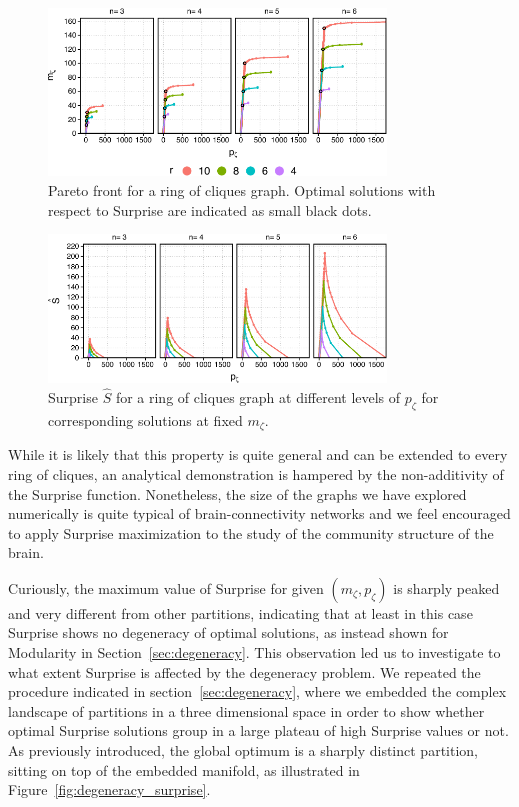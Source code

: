 \begin{figure}[htb!]
\centering
\includegraphics[width=0.8\textwidth]{images/ring_cliques_pareto.pdf}
\caption{Pareto front for a ring of cliques graph. Optimal solutions with respect to Surprise are indicated as small black dots.}
\label{fig:ring_cliques_pareto}
\end{figure}

\begin{figure}[htb!]
\centering
\includegraphics[width=0.8\textwidth]{images/ring_cliques_surprise.pdf}
\caption{Surprise $\hat{S}$ for a ring of cliques graph at different levels of $p_\zeta$ for corresponding solutions at fixed $m_\zeta$.}
\label{fig:ring_cliques_surprise}
\end{figure}

While it is likely that this property is quite general and can be extended to every ring of cliques, an analytical demonstration is hampered by the non-additivity of the Surprise function.
Nonetheless, the size of the graphs we have explored numerically is quite typical of brain-connectivity networks and we feel encouraged to apply Surprise maximization to the study of the community structure of the brain.

Curiously, the maximum value of Surprise for given $(m_\zeta,p_\zeta)$ is sharply peaked and very different from other partitions, indicating that at least in this case Surprise shows no degeneracy of optimal solutions, as instead shown for Modularity in Section~\ref{sec:degeneracy}.
This observation led us to investigate to what extent Surprise is affected by the degeneracy problem.
We repeated the procedure indicated in section~\ref{sec:degeneracy}, where we embedded the complex landscape of partitions in a three dimensional space in order to show whether optimal Surprise solutions group in a large plateau of high Surprise values or not. As previously introduced, the global optimum is a sharply distinct partition, sitting on top of the embedded manifold, as illustrated in Figure~\ref{fig:degeneracy_surprise}.

